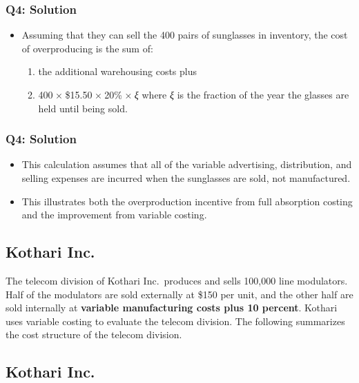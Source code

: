 \hypertarget{q4-solution}{%
\subsubsection{Q4: Solution}\label{q4-solution}}

\begin{itemize}
\tightlist
\item
  Assuming that they can sell the 400 pairs of sunglasses in inventory,
  the cost of overproducing is the sum of:

  \begin{enumerate}
  \def\labelenumi{\arabic{enumi}.}
  \tightlist
  \item
    the additional warehousing costs plus
  \item
    {400 × \$15.50 × 20\% × \emph{ξ}} where {\emph{ξ}} is the fraction
    of the year the glasses are held until being sold.
  \end{enumerate}
\end{itemize}

\hypertarget{q4-solution-1}{%
\subsubsection{Q4: Solution}\label{q4-solution-1}}

\begin{itemize}
\tightlist
\item
  This calculation assumes that all of the variable advertising,
  distribution, and selling expenses are incurred when the sunglasses
  are sold, not manufactured.
\item
  This illustrates both the overproduction incentive from full
  absorption costing and the improvement from variable costing.
\end{itemize}

\hypertarget{kothari-inc.}{%
\subsection{Kothari Inc.}\label{kothari-inc.}}

The telecom division of Kothari Inc.~produces and sells 100,000 line
modulators. Half of the modulators are sold externally at \$150 per
unit, and the other half are sold internally at \textbf{variable
manufacturing costs plus 10 percent}. Kothari uses variable costing to
evaluate the telecom division. The following summarizes the cost
structure of the telecom division.

\hypertarget{kothari-inc.-1}{%
\subsection{Kothari Inc.}\label{kothari-inc.-1}}

